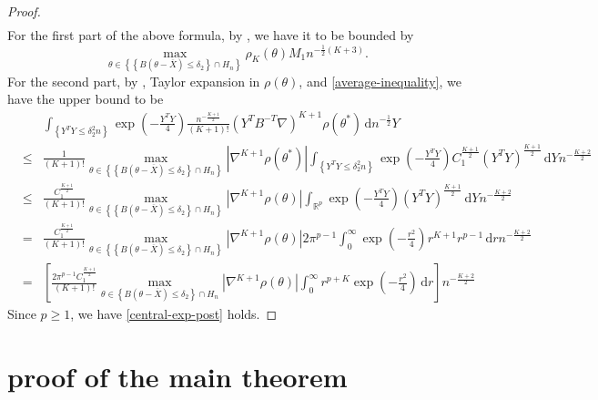 \documentclass[oneside,english]{amsbook}
\numberwithin{section}{chapter}
\numberwithin{equation}{section}
\numberwithin{figure}{section}
\theoremstyle{plain}
\theoremstyle{plain}
\theoremstyle{definition}
\theoremstyle{plain}
\theoremstyle{plain}
\theoremstyle{remark}
\theoremstyle{definition}
\theoremstyle{definition}
\newcommand{\diff}{\,\mathrm{d}}
\begin{document}
\begin{proof}
\begin{eqnarray*}
\end{eqnarray*}
For the first part of the above formula, by ,
we have it to be bounded by 
\[
\max_{\theta\in\left\{ \left\{ B\left(\theta-\overline{X}\right)\le\delta_{2}\right\} \cap H_{n}\right\} }\rho_{K}\left(\theta\right)M_{1}n^{-\frac{1}{2}\left(K+3\right)}.
\]
For the second part, by , Taylor
expansion in $\rho\left(\theta\right)$, and \eqref{average-inequality},
we have the upper bound to be 
\begin{eqnarray*}
 &  & \int_{\left\{ Y^{T}Y\le\delta_{2}^{2}n\right\} }\exp\left(-\frac{Y^{T}Y}{4}\right)\frac{n^{-\frac{K+1}{2}}}{\left(K+1\right)!}\left(Y^{T}B^{-T}\nabla\right)^{K+1}\rho\left(\theta^{*}\right)\diff n^{-\frac{1}{2}}Y\\
 & \le & \frac{1}{\left(K+1\right)!}\max_{\theta\in\left\{ \left\{ B\left(\theta-\overline{X}\right)\le\delta_{2}\right\} \cap H_{n}\right\} }\left|\nabla^{K+1}\rho\left(\theta^{*}\right)\right|\int_{\left\{ Y^{T}Y\le\delta_{2}^{2}n\right\} }\exp\left(-\frac{Y^{T}Y}{4}\right)C_{1}^{\frac{K+1}{2}}\left(Y^{T}Y\right)^{\frac{K+1}{2}}\diff Yn^{-\frac{K+2}{2}}\\
 & \le & \frac{C_{1}^{\frac{K+1}{2}}}{\left(K+1\right)!}\max_{\theta\in\left\{ \left\{ B\left(\theta-\overline{X}\right)\le\delta_{2}\right\} \cap H_{n}\right\} }\left|\nabla^{K+1}\rho\left(\theta\right)\right|\int_{\mathbb{R}^{p}}\exp\left(-\frac{Y^{T}Y}{4}\right)\left(Y^{T}Y\right)^{\frac{K+1}{2}}\diff Yn^{-\frac{K+2}{2}}\\
 & = & \frac{C_{1}^{\frac{K+1}{2}}}{\left(K+1\right)!}\max_{\theta\in\left\{ \left\{ B\left(\theta-\overline{X}\right)\le\delta_{2}\right\} \cap H_{n}\right\} }\left|\nabla^{K+1}\rho\left(\theta\right)\right|2\pi^{p-1}\int_{0}^{\infty}\exp\left(-\frac{r^{2}}{4}\right)r^{K+1}r^{p-1}\diff rn^{-\frac{K+2}{2}}\\
 & = & \left[\frac{2\pi^{p-1}C_{1}^{\frac{K+1}{2}}}{\left(K+1\right)!}\max_{\theta\in\left\{ B\left(\theta-\overline{X}\right)\le\delta_{2}\right\} \cap H_{n}}\left|\nabla^{K+1}\rho\left(\theta\right)\right|\int_{0}^{\infty}r^{p+K}\exp\left(-\frac{r^{2}}{4}\right)\diff r\right]n^{-\frac{K+2}{2}}
\end{eqnarray*}
Since $p\ge1$, we have \eqref{central-exp-post} holds.
\end{proof}

\section{proof of the main theorem}
\end{document}
